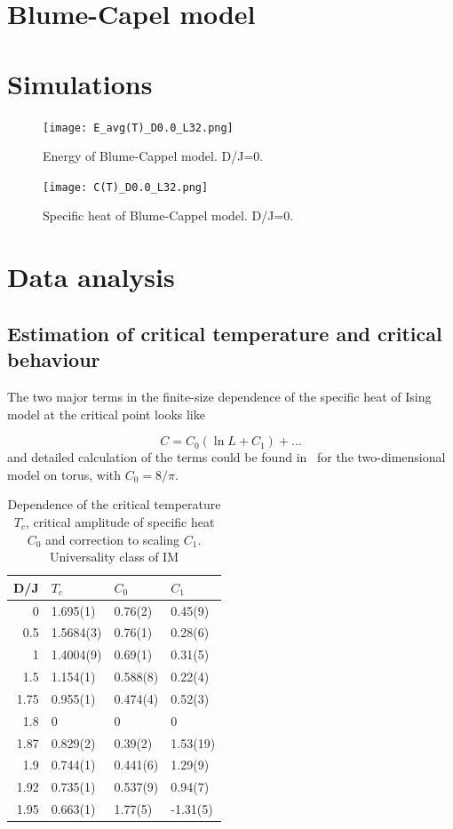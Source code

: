 \documentclass[aps,prl,amssymb,amsmath,twocolumn,floatfix]{revtex4}
\begin{document}
\section{Blume-Capel model}

\section{Simulations}

\begin{figure}
  \centering
  \texttt{[image: E\_avg(T)\_D0.0\_L32.png]}
  \caption{Energy of Blume-Cappel model. D/J=0.}
  \label{fig:BC-E-0}
\end{figure}
\begin{figure}
  \centering
  \texttt{[image: C(T)\_D0.0\_L32.png]}
  \caption{Specific heat of Blume-Cappel model. D/J=0. }
  \label{fig:BC-C-0}
\end{figure}


\section{Data analysis}

\subsection{Estimation of critical temperature and critical behaviour}

The two major terms in the finite-size dependence of the specific heat of Ising model at the critical point looks like~\cite{FF1969}

\begin{equation}
C=C_0 \left( \ln L +C_1\right) + ...
\end{equation}
and detailed calculation of the terms could be found in~\cite{Salas2001,Kolya2002} for the two-dimensional model on torus, with $C_0=8/\pi$. 

\begin{table}[ht]
\caption{Dependence of the critical temperature $T_c$, critical amplitude of specific heat $C_0$ and correction to scaling $C_1$. Universality class of IM}
\label{table1}
\begin{tabular}{|r|l|l|l|}
\hline
D/J &  $T_c$    &  $C_0$    &   $C_1$         \\
\hline
 0   &  1.695(1) &  0.76(2) & 0.45(9)\\
 0.5 & 1.5684(3) & 0.76(1) & 0.28(6) \\
 1 & 1.4004(9) & 0.69(1) & 0.31(5) \\
 1.5 & 1.154(1) & 0.588(8) & 0.22(4) \\
 1.75 & 0.955(1) & 0.474(4) & 0.52(3) \\
 1.8 & 0 & 0 & 0 \\
 1.87 & 0.829(2) & 0.39(2) & 1.53(19) \\ 
 1.9 & 0.744(1) & 0.441(6) & 1.29(9) \\
 1.92 & 0.735(1) & 0.537(9) & 0.94(7) \\
 1.95 & 0.663(1) & 1.77(5) & -1.31(5) \\
 \hline
\end{tabular}
\end{table}
 
\end{document}
